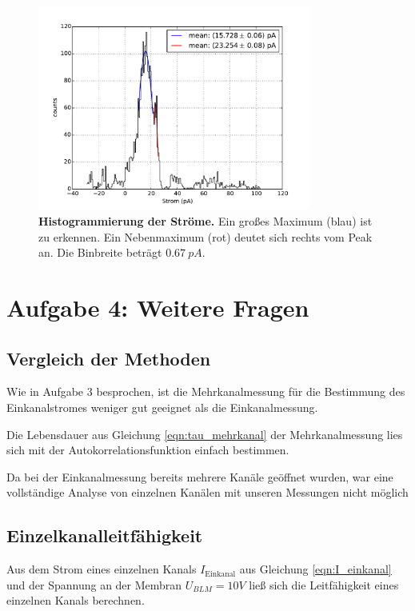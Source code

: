 \documentclass[a4paper,ngerman]{scrartcl}
\begin{document}
\begin{figure}[tbh!]
\includegraphics[width=0.8\textwidth]{abbildungen/mehrkanal_histo.pdf}
\caption{\textbf{Histogrammierung der Ströme.} Ein großes Maximum (blau) ist zu erkennen. Ein Nebenmaximum (rot) deutet sich rechts vom Peak an. Die Binbreite beträgt $\SI{0.67}{pA}$.}
\label{fig:mehrkanal-histo}
\end{figure}



\clearpage
\section{Aufgabe 4: Weitere Fragen}

\subsection{Vergleich der Methoden}

Wie in Aufgabe 3 besprochen, ist die Mehrkanalmessung für die Bestimmung des Einkanalstromes weniger gut geeignet als die Einkanalmessung.

Die Lebensdauer aus Gleichung \ref{eqn:tau_mehrkanal} der Mehrkanalmessung lies sich mit der Autokorrelationsfunktion einfach bestimmen. 

Da bei der Einkanalmessung bereits mehrere Kanäle geöffnet wurden, war eine vollständige Analyse von einzelnen Kanälen mit unseren Messungen nicht möglich



\subsection{Einzelkanalleitfähigkeit}

Aus dem Strom eines einzelnen Kanals $I_{\text{Einkanal}}$ aus Gleichung \ref{eqn:I_einkanal} und der Spannung an der Membran $U_{BLM}= 10 V$ ließ sich die Leitfähigkeit eines einzelnen Kanals berechnen.
\end{document}
